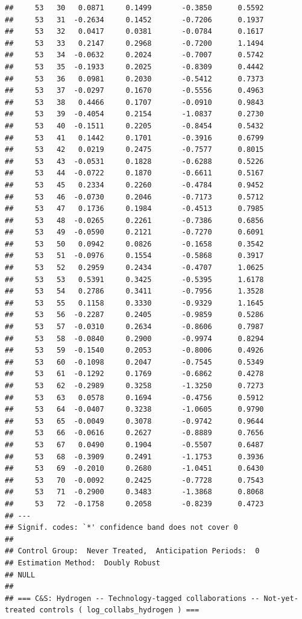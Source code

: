 \documentclass[
]{article}
\begin{document}
\begin{verbatim}
##     53   30   0.0871     0.1499       -0.3850      0.5592  
##     53   31  -0.2634     0.1452       -0.7206      0.1937  
##     53   32   0.0417     0.0381       -0.0784      0.1617  
##     53   33   0.2147     0.2968       -0.7200      1.1494  
##     53   34  -0.0632     0.2024       -0.7007      0.5742  
##     53   35  -0.1933     0.2025       -0.8309      0.4442  
##     53   36   0.0981     0.2030       -0.5412      0.7373  
##     53   37  -0.0297     0.1670       -0.5556      0.4963  
##     53   38   0.4466     0.1707       -0.0910      0.9843  
##     53   39  -0.4054     0.2154       -1.0837      0.2730  
##     53   40  -0.1511     0.2205       -0.8454      0.5432  
##     53   41   0.1442     0.1701       -0.3916      0.6799  
##     53   42   0.0219     0.2475       -0.7577      0.8015  
##     53   43  -0.0531     0.1828       -0.6288      0.5226  
##     53   44  -0.0722     0.1870       -0.6611      0.5167  
##     53   45   0.2334     0.2260       -0.4784      0.9452  
##     53   46  -0.0730     0.2046       -0.7173      0.5712  
##     53   47   0.1736     0.1984       -0.4513      0.7985  
##     53   48  -0.0265     0.2261       -0.7386      0.6856  
##     53   49  -0.0590     0.2121       -0.7270      0.6091  
##     53   50   0.0942     0.0826       -0.1658      0.3542  
##     53   51  -0.0976     0.1554       -0.5868      0.3917  
##     53   52   0.2959     0.2434       -0.4707      1.0625  
##     53   53   0.5391     0.3425       -0.5395      1.6178  
##     53   54   0.2786     0.3411       -0.7956      1.3528  
##     53   55   0.1158     0.3330       -0.9329      1.1645  
##     53   56  -0.2287     0.2405       -0.9859      0.5286  
##     53   57  -0.0310     0.2634       -0.8606      0.7987  
##     53   58  -0.0840     0.2900       -0.9974      0.8294  
##     53   59  -0.1540     0.2053       -0.8006      0.4926  
##     53   60  -0.1098     0.2047       -0.7545      0.5349  
##     53   61  -0.1292     0.1769       -0.6862      0.4278  
##     53   62  -0.2989     0.3258       -1.3250      0.7273  
##     53   63   0.0578     0.1694       -0.4756      0.5912  
##     53   64  -0.0407     0.3238       -1.0605      0.9790  
##     53   65  -0.0049     0.3078       -0.9742      0.9644  
##     53   66  -0.0616     0.2627       -0.8889      0.7656  
##     53   67   0.0490     0.1904       -0.5507      0.6487  
##     53   68  -0.3909     0.2491       -1.1753      0.3936  
##     53   69  -0.2010     0.2680       -1.0451      0.6430  
##     53   70  -0.0092     0.2425       -0.7728      0.7543  
##     53   71  -0.2900     0.3483       -1.3868      0.8068  
##     53   72  -0.1758     0.2058       -0.8239      0.4723  
## ---
## Signif. codes: `*' confidence band does not cover 0
## 
## Control Group:  Never Treated,  Anticipation Periods:  0
## Estimation Method:  Doubly Robust
## NULL
## 
## === C&S: Hydrogen -- Technology-tagged collaborations -- Not-yet-treated controls ( log_collabs_hydrogen ) ===
\end{verbatim}
\end{document}
